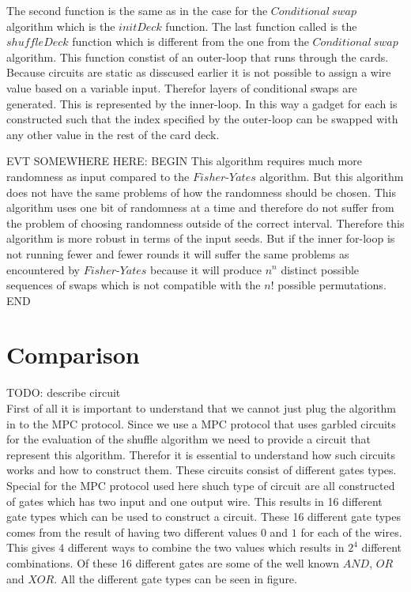 \documentclass[twoside,11pt,openright]{report}
\newcommand{\todo}[1]{}
\renewcommand{\todo}[1]{{\color{red} TODO: {#1}} \\}
\begin{document}
The second function is the same as in the case for the $Conditional~swap$ algorithm which is the $initDeck$ function. The last function called is the $shuffleDeck$ function which is different from the one from the $Conditional~swap$ algorithm. This function constist of an outer-loop that runs through the cards. Because circuits are static as disscused earlier it is not possible to assign a wire value based on a variable input. Therefor layers of conditional swaps are generated. This is represented by the inner-loop. In this way a gadget for each is constructed such that the index specified by the outer-loop can be swapped with any other value in the rest of the card deck.



EVT SOMEWHERE HERE:
BEGIN
This algorithm requires much more randomness as input compared to the $Fisher\text{-}Yates$ algorithm. But this algorithm does not have the same problems of how the randomness should be chosen. This algorithm uses one bit of randomness at a time and therefore do not suffer from the problem of choosing randomness outside of the correct interval. Therefore this algorithm is more robust in terms of the input seeds. But if the inner for-loop is not running fewer and fewer rounds it will suffer the same problems as encountered by $Fisher\text{-}Yates$ because it will produce $n^n$ distinct possible sequences of swaps which is not compatible with the $n!$ possible permutations.
END

\section{Comparison}
\label{sec:comp}
\todo{describe circuit}
First of all it is important to understand that we cannot just plug the algorithm in to the MPC protocol. Since we use a MPC protocol that uses garbled circuits for the evaluation of the shuffle algorithm we need to provide a circuit that represent this algorithm. Therefor it is essential to understand how such circuits works and how to construct them. These circuits consist of different gates types. Special for the MPC protocol used here shuch type of circuit are all constructed of gates which has two input and one output wire. This results in 16 different gate types which can be used to construct a circuit. These 16 different gate types comes from the result of having two different values $0$ and $1$ for each of the wires. This gives $4$ different ways to combine the two values which results in $2^4$ different combinations. Of these 16 different gates are some of the well known $AND$, $OR$ and $XOR$. All the different gate types can be seen in figure.
\end{document}
